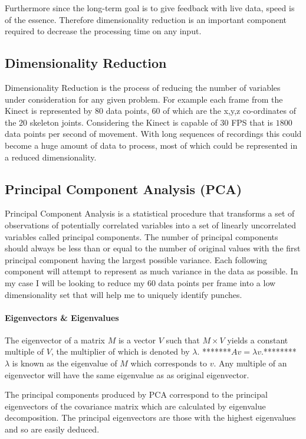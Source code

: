 Furthermore since the long-term goal is to give feedback with live data, speed is of the essence. Therefore dimensionality reduction is an important component required to decrease the processing time on any input.

\subsection{Dimensionality Reduction}
Dimensionality Reduction is the process of reducing the number of variables under consideration for any given problem. For example each frame from the Kinect is represented by 80 data points, 60 of which are the x,y,z co-ordinates of the 20 skeleton joints. Considering the Kinect is capable of 30 FPS that is $1800$ data points per second of movement. With long sequences of recordings this could become a huge amount of data to process, most of which could be represented in a reduced dimensionality.

\subsection{Principal Component Analysis (PCA)}
\label{subsec:subsec01}
Principal Component Analysis is a statistical procedure that transforms a set of observations of potentially correlated variables into a set of linearly uncorrelated variables called principal components. The number of principal components should always be less than or equal to the number of original values with the first principal component having the largest possible variance. Each following component will attempt to represent as much variance in the data as possible. In my case I will be looking to reduce my 60 data points per frame into a low dimensionality set that will help me to uniquely identify punches.

\paragraph{Eigenvectors \& Eigenvalues}
The eigenvector of a matrix $M$ is a vector $V$ such that $M\times V$ yields a constant multiple of $V$, the multiplier of which is denoted by $\lambda.$
*******$Av = \lambda v$.********
$\lambda$ is known as the eigenvalue of $M$ which corresponds to $v$. Any multiple of an eigenvector will have the same eigenvalue as as original eigenvector.

The principal components produced by PCA correspond to the principal eigenvectors of the covariance matrix which are calculated by eigenvalue decomposition. The principal eigenvectors are those with the highest eigenvalues and so are easily deduced. 

